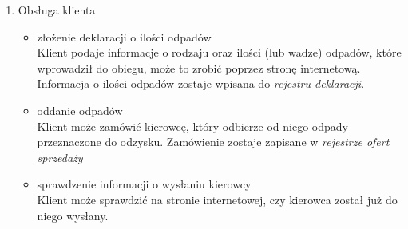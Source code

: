 
\begin{enumerate}
	\item Obsługa klienta
		\begin{itemize}
		\item złożenie deklaracji o ilości odpadów \\
		Klient podaje informacje o rodzaju oraz ilości (lub wadze) odpadów, które wprowadził do obiegu, może to zrobić poprzez stronę internetową. Informacja o ilości odpadów zostaje wpisana do \emph{rejestru deklaracji}.
		\item oddanie odpadów \\
		Klient może zamówić kierowcę, który odbierze od niego odpady przeznaczone do odzysku. Zamówienie zostaje zapisane w \emph{rejestrze ofert sprzedaży}
		\item sprawdzenie informacji o wysłaniu kierowcy \\ 
		Klient może sprawdzić na stronie internetowej, czy kierowca został już do niego wysłany. 
		\end{itemize}


\end{enumerate}
